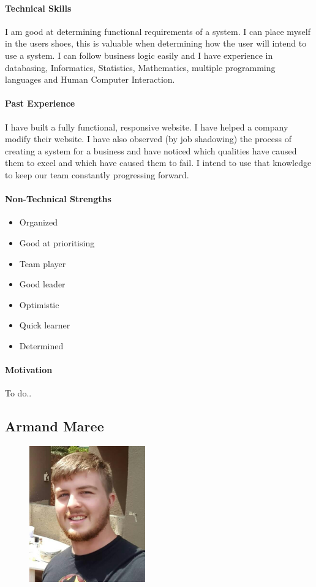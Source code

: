 \documentclass[english]{article}
\begin{document}
			\paragraph{Technical Skills}
			I am good at determining functional requirements of a system. I can place myself in the users shoes, this is valuable when determining how the user will intend to use a system. I can follow business logic easily and I have experience in databasing, Informatics, Statistics, Mathematics, multiple programming languages and Human Computer Interaction.
			
			\paragraph{Past Experience}
			I have built a fully functional, responsive website. I have helped a company modify their website. I have also observed (by job shadowing) the process of creating a system for a business and have noticed which qualities have caused them to excel and which have caused them to fail. I intend to use that knowledge to keep our team constantly progressing forward.
			
			\paragraph{Non-Technical Strengths}
			\begin{itemize}
				\setlength\itemsep{0.2em}
			        \item Organized
			        \item Good at prioritising 
			        \item Team player
			        \item Good leader
			        \item Optimistic
			        \item Quick learner
			        \item Determined
			\end{itemize}
			
			\paragraph{Motivation}
			To do..
		\newpage
		\subsection{Armand Maree}
			\begin{figure}
				\begin{center}
					\includegraphics[width=5cm]{armand.jpg}
				\end{center}
			\end{figure}
\end{document}
